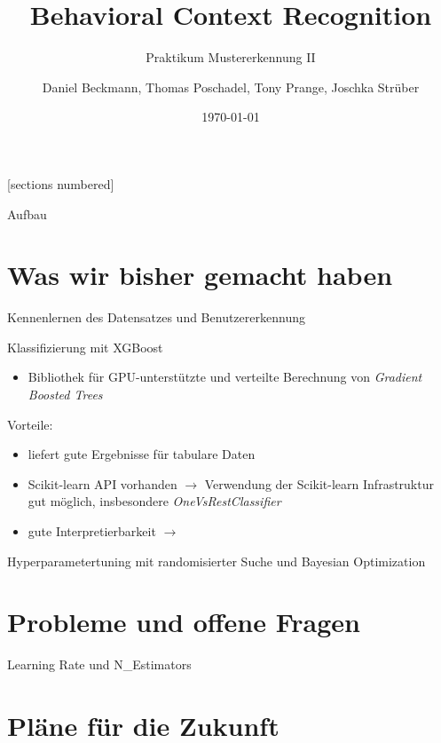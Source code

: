 \documentclass[10pt,%
	wide,%
	xcolor={x11names},%
	hyperref={colorlinks},%
	pantone312,%
	handout,%
	]{beamer}
\author{Daniel Beckmann, Thomas Poschadel, Tony Prange, Joschka Strüber}
\title{Behavioral Context Recognition}
\subtitle{Praktikum Mustererkennung II}
\date{\today}
\begin{document}
[sections numbered]

\begin{frame}[plain]
  \maketitle
\end{frame}

\begin{frame}[t]{Aufbau}
\end{frame}

\section{Was wir bisher gemacht haben}

\begin{frame}[t]{Kennenlernen des Datensatzes und Benutzererkennung}

\end{frame}

\begin{frame}[t]{Klassifizierung mit XGBoost}
	\begin{itemize}
		\item Bibliothek für GPU-unterstützte und verteilte Berechnung von \emph{Gradient Boosted Trees}
	\end{itemize}
	Vorteile:
	\begin{itemize}
		\item liefert gute Ergebnisse für tabulare Daten
		\item Scikit-learn API vorhanden $\rightarrow$ Verwendung der Scikit-learn Infrastruktur gut möglich, insbesondere \emph{OneVsRestClassifier}
		\item gute Interpretierbarkeit $\rightarrow$ 
	\end{itemize}
\end{frame}

\begin{frame}[t]{Hyperparametertuning mit randomisierter Suche und Bayesian Optimization}
	
\end{frame}

\section{Probleme und offene Fragen}

\begin{frame}[t]{Learning Rate und N\_Estimators}
	
\end{frame}

\begin{frame}[t]{NaN-Werte in den Labeln
	
\end{frame}

\begin{frame}[t]{
	
\end{frame}

\section{Pläne für die Zukunft}
\end{document}
